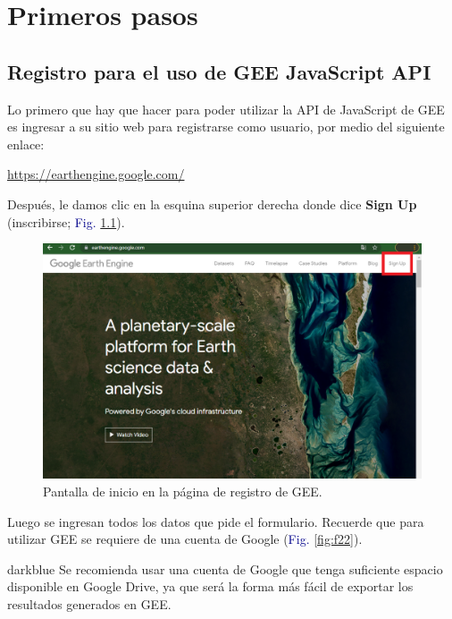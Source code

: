 \documentclass[
  12pt,
  letterpaper,
  twoside]{book}
\begin{document}
\newpage

\hypertarget{primeros-pasos}{%
\chapter{Primeros pasos}\label{primeros-pasos}}

\hypertarget{registro-para-el-uso-de-gee-javascript-api}{%
\section{Registro para el uso de GEE JavaScript API}\label{registro-para-el-uso-de-gee-javascript-api}}

Lo primero que hay que hacer para poder utilizar la API de JavaScript de GEE es ingresar a su sitio web para registrarse como usuario, por medio del siguiente enlace:

\url{https://earthengine.google.com/}

Después, le damos clic en la esquina superior derecha donde dice \textbf{Sign Up} (inscribirse; \textcolor{darkblue}{Fig.} \ref{fig:f21}).

\begin{figure}[H]

{\centering \includegraphics[width=0.8\linewidth]{Img/Signup} 

}

\caption{Pantalla de inicio en la página de registro de GEE.}\label{fig:f21}
\end{figure}

Luego se ingresan todos los datos que pide el formulario. Recuerde que para utilizar GEE se requiere de una cuenta de Google (\textcolor{darkblue}{Fig.} \ref{fig:f22}).

\begin{bluebox2}

\begin{awesomeblock}{5pt}{\faLightbulb}{darkblue}
Se recomienda usar una cuenta de Google que tenga suficiente espacio disponible en Google Drive, ya que será la forma más fácil de exportar los resultados generados en GEE.

\end{awesomeblock}

\end{bluebox2}
\end{document}
